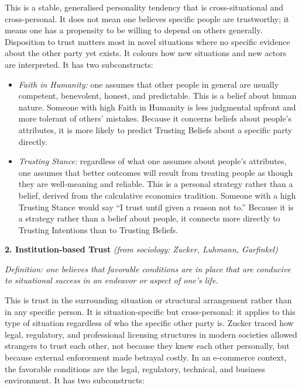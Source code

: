 \documentclass[11pt, a4paper]{article}
\begin{document}
This is a stable, generalised personality tendency that is cross-situational and cross-personal. It does not mean one believes specific people are trustworthy; it means one has a propensity to be willing to depend on others generally. Disposition to trust matters most in novel situations where no specific evidence about the other party yet exists. It colours how new situations and new actors are interpreted. It has two subconstructs:

\begin{itemize}
  \item \textit{Faith in Humanity:} one assumes that other people in general are usually competent, benevolent, honest, and predictable. This is a belief about human nature. Someone with high Faith in Humanity is less judgmental upfront and more tolerant of others' mistakes. Because it concerns beliefs about people's attributes, it is more likely to predict Trusting Beliefs about a specific party directly.
  \item \textit{Trusting Stance:} regardless of what one assumes about people's attributes, one assumes that better outcomes will result from treating people as though they are well-meaning and reliable. This is a personal strategy rather than a belief, derived from the calculative economics tradition. Someone with a high Trusting Stance would say ``I trust until given a reason not to.'' Because it is a strategy rather than a belief about people, it connects more directly to Trusting Intentions than to Trusting Beliefs.
\end{itemize}

\medskip
\noindent\textbf{2. Institution-based Trust} \quad \textit{(from sociology: Zucker, Luhmann, Garfinkel)}

\medskip
\noindent\textit{Definition: one believes that favorable conditions are in place that are conducive to situational success in an endeavor or aspect of one's life.}

This is trust in the surrounding situation or structural arrangement rather than in any specific person. It is situation-specific but cross-personal: it applies to this type of situation regardless of who the specific other party is. Zucker traced how legal, regulatory, and professional licensing structures in modern societies allowed strangers to trust each other, not because they knew each other personally, but because external enforcement made betrayal costly. In an e-commerce context, the favorable conditions are the legal, regulatory, technical, and business environment. It has two subconstructs:
\end{document}
